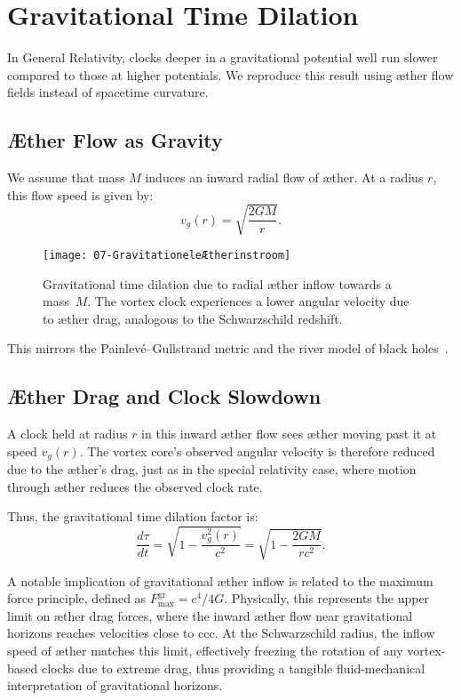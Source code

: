 \section{Gravitational Time Dilation}

In General Relativity, clocks deeper in a gravitational potential well run slower compared to those at higher potentials. We reproduce this result using æther flow fields instead of spacetime curvature.

\subsection*{Æther Flow as Gravity}

We assume that mass $M$ induces an inward radial flow of æther. At a radius $r$, this flow speed is given by:
\[
v_g(r) = \sqrt{\frac{2GM}{r}}.
\]

\begin{figure}[htbp]
    \centering
    \texttt{[image: 07-GravitationeleÆtherinstroom]}
    \caption{Gravitational time dilation due to radial æther inflow towards a mass~$M$. The vortex clock experiences a lower angular velocity due to æther drag, analogous to the Schwarzschild redshift.}
    \label{fig:GravitationeleÆtherinstroom}
\end{figure}

This mirrors the Painlevé–Gullstrand metric and the river model of black holes~\cite{Hamilton2004-river}.

\subsection*{Æther Drag and Clock Slowdown}

A clock held at radius $r$ in this inward æther flow sees æther moving past it at speed $v_g(r)$. The vortex core's observed angular velocity is therefore reduced due to the æther's drag, just as in the special relativity case, where motion through æther reduces the observed clock rate.

Thus, the gravitational time dilation factor is:
\[
\frac{d\tau}{dt} = \sqrt{1 - \frac{v_g^2(r)}{c^2}} = \sqrt{1 - \frac{2GM}{rc^2}}. \tag{4}
\]

A notable implication of gravitational æther inflow is related to the maximum force principle, defined as $F^{\text{gr}}_{\text{max}} = c^4 /4G$. Physically, this represents the upper limit on æther drag forces, where the inward æther flow near gravitational horizons reaches velocities close to ccc. At the Schwarzschild radius, the inflow speed of æther matches this limit, effectively freezing the rotation of any vortex-based clocks due to extreme drag, thus providing a tangible fluid-mechanical interpretation of gravitational horizons.

